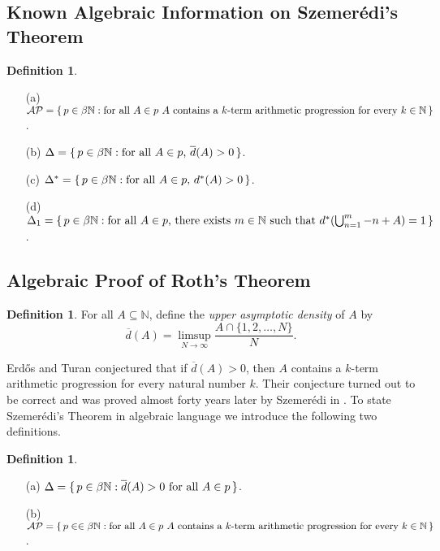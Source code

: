 \documentclass[12pt]{article}
\theoremstyle{plain}
\theoremstyle{definition}
\newtheorem{defn}[thm]{Definition}
\newcommand{\bbN}{\mathbb{N}}
\begin{document}
\subsection{Known Algebraic Information on  Szemer\'{e}di's Theorem}

  \begin{defn}
    \begin{itemize}
      \item[(a)] $\mathcal{AP} = \{\, p \in \beta\bbN : \hbox{for all
          $A \in p$ $A$ contains a $k$-term arithmetic progression
          for every $k \in \bbN$} \,\}$.
      \item[(b)] $\Delta = \{\, p \in \beta\bbN : \hbox{for all $A \in
          p$, $\overline{d}(A) > 0$} \,\}$.
      \item[(c)] $\Delta^* = \{\, p \in \beta\bbN : \hbox{for all $A
          \in p$, $d^*(A) > 0$} \,\}$.
      \item[(d)] $\Delta_1 = \{\, p \in \beta\bbN : \hbox{for all $A
            \in p$, there exists $m \in \bbN$ such that
            $d^*(\bigcup_{n=1}^m -n+A) = 1$} \,\}$.
    \end{itemize}
  \end{defn}


\subsection{Algebraic Proof of Roth's Theorem}

  \begin{defn}
    For all $A \subseteq \bbN$, define the \textsl{upper asymptotic
      density} of $A$ by 
      \[
        \overline{d}(A) = \limsup_{N\to\infty} \frac{A \cap \{1, 2,
          \ldots, N\}}{N}.
      \]
  \end{defn}

Erd\H{o}s and Turan conjectured that if $\overline{d}(A) > 0$, then
$A$ contains a $k$-term arithmetic progression for every natural
number $k$.
Their conjecture turned out to be correct and was proved almost forty
years later by Szemer\'{e}di in \cite{Szemeredi:1975uq}. 
To state Szemer\'{e}di's Theorem in algebraic language we introduce
the following two definitions.
  \begin{defn}
    \begin{itemize}
      \item[(a)] $\Delta = \{\, p \in \beta\bbN : \overline{d}(A) > 0
        \hbox{ for all } A \in p \,\}$.
      \item[(b)] $\mathcal{AP} = \{\, p \in \in \beta\bbN : \hbox{for
          all $A \in p$ } A \hbox{ contains a $k$-term arithmetic
          progression for every $k \in \bbN$} \,\}$.
    \end{itemize}
  \end{defn}
\end{document}
